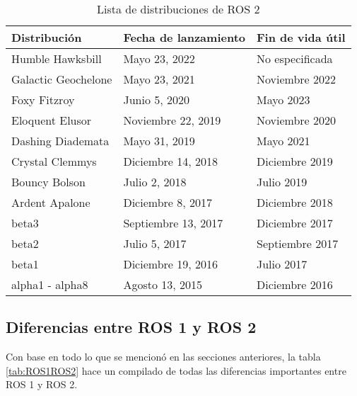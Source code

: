\begin{table}
    \centering
    \begin{tabular}{lll}
        \hline
        \textbf{Distribución} & \textbf{Fecha de lanzamiento} & \textbf{Fin de vida útil}\\
        \hline \hline
        Humble Hawksbill & Mayo 23, 2022 & No especificada\\
        Galactic Geochelone & Mayo 23, 2021 & Noviembre 2022\\
        Foxy Fitzroy & Junio 5, 2020 & Mayo 2023\\
        Eloquent Elusor & Noviembre  22, 2019 & Noviembre 2020\\
        Dashing Diademata & Mayo 31, 2019 & Mayo 2021\\
        Crystal Clemmys & Diciembre 14, 2018 & Diciembre 2019\\
        Bouncy Bolson & Julio 2, 2018 & Julio 2019\\
        Ardent Apalone & Diciembre 8, 2017 & Diciembre 2018\\
        beta3 & Septiembre 13, 2017 & Diciembre 2017\\
        beta2 & Julio 5, 2017 & Septiembre 2017\\
        beta1 & Diciembre 19, 2016 & Julio 2017\\
        alpha1 - alpha8 & Agosto 13, 2015 & Diciembre 2016\\
        \hline \hline
    \end{tabular}
    \caption{Lista de distribuciones de ROS 2}
    \label{tab:rosd}
\end{table}

\subsection{Diferencias entre ROS 1 y ROS 2}
Con base en todo lo que se mencionó en las secciones anteriores, la tabla \ref{tab:ROS1ROS2} hace un compilado de todas las diferencias importantes entre ROS 1 y ROS 2.

